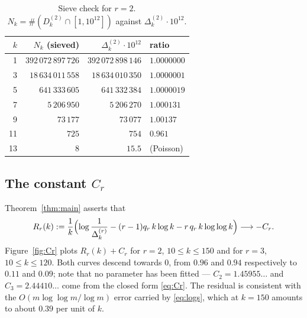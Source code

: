 \documentclass[11pt,reqno]{amsart}
\theoremstyle{plain}
\theoremstyle{definition}
\numberwithin{equation}{section}
\begin{document}
\begin{table}[ht]
\caption{Sieve check for $r=2$. $N_k=\#(D^{(2)}_k\cap[1,10^{12}])$ against
$\Delta^{(2)}_k\cdot10^{12}$.}
\label{tab:sieve}
\begin{tabular}{rrrl}
\toprule
$k$ & $N_k$ (sieved) & $\Delta^{(2)}_k\cdot10^{12}$ & ratio\\
\midrule
1 & $392\,072\,897\,726$ & $392\,072\,898\,146$ & $1.0000000$\\
3 & $18\,634\,011\,558$ & $18\,634\,010\,350$ & $1.0000001$\\
5 & $641\,333\,605$ & $641\,332\,384$ & $1.0000019$\\
7 & $5\,206\,950$ & $5\,206\,270$ & $1.000131$\\
9 & $73\,177$ & $73\,077$ & $1.00137$\\
11 & $725$ & $754$ & $0.961$\\
13 & $8$ & $15.5$ & (Poisson)\\
\bottomrule
\end{tabular}
\end{table}

\subsection{The constant $C_r$}\label{sub:Cr}
Theorem~\ref{thm:main} asserts that
\[
  R_r(k):=\frac1k\Bigl(\log\frac1{\Delta^{(r)}_k}-(r-1)q_r\,k\log k
  -r\,q_r\,k\log\log k\Bigr)\longrightarrow -C_r .
\]
Figure~\ref{fig:Cr} plots $R_r(k)+C_r$ for $r=2$, $10\le k\le150$ and for $r=3$,
$10\le k\le120$. Both curves descend towards $0$, from $0.96$ and $0.94$ respectively to
$0.11$ and $0.09$; note that no parameter has been fitted --- $C_2=1.45955\ldots$ and
$C_3=2.44410\ldots$ come from the closed form \eqref{eq:Cr}. The residual is consistent
with the $O(m\log\log m/\log m)$ error carried by \eqref{eq:logs}, which at $k=150$
amounts to about $0.39$ per unit of $k$.
\end{document}
